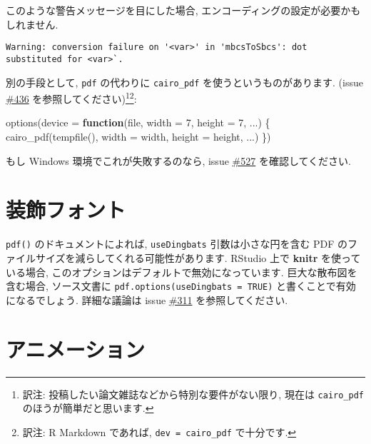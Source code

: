 \documentclass[
  lualatex,ja=standard,jafont=noto-otf]{bxjsreport}
\newenvironment{Shaded}{\begin{snugshade}}{\end{snugshade}}
\newcommand{\AttributeTok}[1]{\textcolor[rgb]{0.77,0.63,0.00}{#1}}
\newcommand{\ControlFlowTok}[1]{\textcolor[rgb]{0.13,0.29,0.53}{\textbf{#1}}}
\newcommand{\DecValTok}[1]{\textcolor[rgb]{0.00,0.00,0.81}{#1}}
\newcommand{\FunctionTok}[1]{\textcolor[rgb]{0.00,0.00,0.00}{#1}}
\newcommand{\NormalTok}[1]{#1}
\begin{document}
このような警告メッセージを目にした場合,
エンコーディングの設定が必要かもしれません.

\begin{verbatim}
Warning: conversion failure on '<var>' in 'mbcsToSbcs': dot substituted for <var>`.
\end{verbatim}

別の手段として, \texttt{pdf} の代わりに \texttt{cairo\_pdf}
を使うというものがあります. (issue
\href{https://github.com/yihui/knitr/issues/436}{\#436}
を参照してください)\footnote{訳注:
  投稿したい論文雑誌などから特別な要件がない限り, 現在は
  \texttt{cairo\_pdf} のほうが簡単だと思います.}\footnote{訳注: R
  Markdown であれば,
  \texttt{dev\ =\ \textquotesingle{}cairo\_pdf\textquotesingle{}}
  で十分です.}:

\begin{Shaded}
\begin{Highlighting}[numbers=left,,]
\FunctionTok{options}\NormalTok{(}\AttributeTok{device =} \ControlFlowTok{function}\NormalTok{(file, }\AttributeTok{width =} \DecValTok{7}\NormalTok{, }\AttributeTok{height =} \DecValTok{7}\NormalTok{, ...) \{}
  \FunctionTok{cairo\_pdf}\NormalTok{(}\FunctionTok{tempfile}\NormalTok{(), }\AttributeTok{width =}\NormalTok{ width, }\AttributeTok{height =}\NormalTok{ height, ...)}
\NormalTok{\})}
\end{Highlighting}
\end{Shaded}

もし Windows 環境でこれが失敗するのなら, issue
\href{https://github.com/yihui/knitr/issues/527}{\#527}
を確認してください.

\hypertarget{ux88c5ux98feux30d5ux30a9ux30f3ux30c8}{%
\section*{装飾フォント}\label{ux88c5ux98feux30d5ux30a9ux30f3ux30c8}}

\texttt{pdf()} のドキュメントによれば, \texttt{useDingbats}
引数は小さな円を含む PDF
のファイルサイズを減らしてくれる可能性があります. RStudio 上で
\textbf{knitr} を使っている場合,
このオプションはデフォルトで無効になっています. 巨大な散布図を含む場合,
ソース文書に \texttt{pdf.options(useDingbats\ =\ TRUE)}
と書くことで有効になるでしょう. 詳細な議論は issue
\href{https://github.com/yihui/knitr/issues/311}{\#311}
を参照してください.

\hypertarget{ux30a2ux30cbux30e1ux30fcux30b7ux30e7ux30f3}{%
\section*{アニメーション}\label{ux30a2ux30cbux30e1ux30fcux30b7ux30e7ux30f3}}
\end{document}
